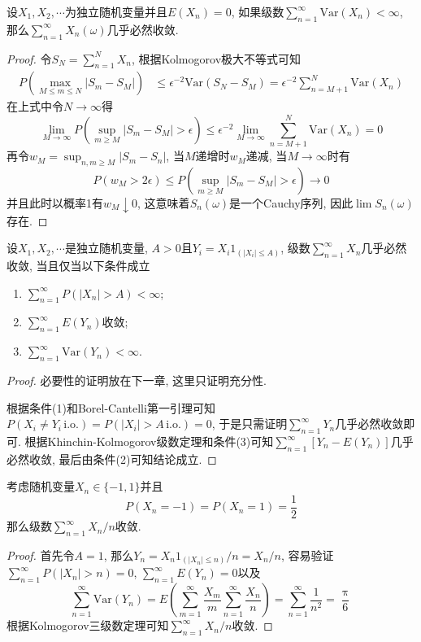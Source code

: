 \documentclass[cn, 12pt, math=mtpro2, bibstyle=apa, blue, twocol]{elegantbook}
\begin{document}
\begin{theorem}
  设$X_1,X_2,\cdots$为独立随机变量并且$E(X_n)=0$, 如果级数$\sum_{n=1}^{\infty}\text{Var}(X_n)<\infty$, 那么$\sum_{n=1}^{\infty}X_n(\omega)$几乎必然收敛.
\end{theorem}
\begin{proof}
  令$S_N=\sum_{n=1}^{N}X_n$, 根据Kolmogorov极大不等式可知
  \begin{align*}
  P\left(\max_{M\leq m\leq N}|S_m-S_M|\right)&\leq\epsilon^{-2}\text{Var}(S_N-S_M)=\epsilon^{-2}\sum_{n=M+1}^{N}\text{Var}(X_n)
  \end{align*}
  在上式中令$N\to\infty$得
  $$\lim_{M\to\infty} P\left(\sup_{m\geq M}|S_m-S_M|>\epsilon\right)\leq\epsilon^{-2}\lim_{M\to\infty}\sum_{n=M+1}^{N}\text{Var}(X_n)= 0$$
  再令$w_M=\sup_{n,m\geq M}|S_m-S_n|$, 当$M$递增时$w_M$递减, 当$M\to\infty$时有
  $$P(w_M>2\epsilon)\leq P\left(\sup_{m\geq M}|S_m-S_M|>\epsilon\right)\to0$$
  并且此时以概率1有$w_M\downarrow 0$, 这意味着$S_n(\omega)$是一个Cauchy序列, 因此$\lim S_n(\omega)$存在.

\end{proof}
\begin{theorem}[Kolmogorov三级数定理]
  设$X_1,X_2,\cdots$是独立随机变量, $A>0$且$Y_i=X_i1_{(|X_i|\leq A)}$, 级数$\sum_{n=1}^{\infty}X_n$几乎必然收敛, 当且仅当以下条件成立
  \begin{enumerate}[label=(\arabic*)]
    \item $\sum_{n=1}^{\infty}P(|X_n|>A)<\infty$;
    \item $\sum_{n=1}^{\infty}E(Y_n)$收敛;
    \item $\sum_{n=1}^{\infty}\text{Var}(Y_n)<\infty$.
  \end{enumerate}
\end{theorem}
\begin{proof}
  必要性的证明放在下一章, 这里只证明充分性.

  根据条件(1)和Borel-Cantelli第一引理可知$P(X_i\neq Y_i\,\text{i.o.})=P(|X_i|>A\,\text{i.o.})=0$, 于是只需证明$\sum_{n=1}^{\infty}Y_n$几乎必然收敛即可. 根据Khinchin-Kolmogorov级数定理和条件(3)可知$\sum_{n=1}^{\infty} [Y_n-E(Y_n)]$几乎必然收敛, 最后由条件(2)可知结论成立.
\end{proof}
\begin{example}[随机调和级数]
  考虑随机变量$X_n\in \{-1,1\}$并且
  $$P(X_n=-1)=P(X_n=1)=\frac{1}{2}$$
  那么级数$\sum_{n=1}^{\infty}X_n/n$收敛.
\end{example}
\begin{proof}
  首先令$A=1$, 那么$Y_n=X_n1_{(|X_n|\leq n)}/n=X_n/n$, 容易验证$\sum_{n=1}^{\infty}P(|X_n|>n)=0$, $\sum_{n=1}^{\infty}E(Y_n)=0$以及
  $$\sum_{n=1}^{\infty}\text{Var}(Y_n)=E\left(\sum_{m=1}^{\infty}\frac{X_m}{m}\sum_{n=1}^{\infty}\frac{X_n}{n}\right)=\sum_{n=1}^{\infty}\frac{1}{n^2}=\frac{\uppi}{6}$$
  根据Kolmogorov三级数定理可知$\sum_{n=1}^{\infty}X_n/n$收敛.
\end{proof}
\end{document}
